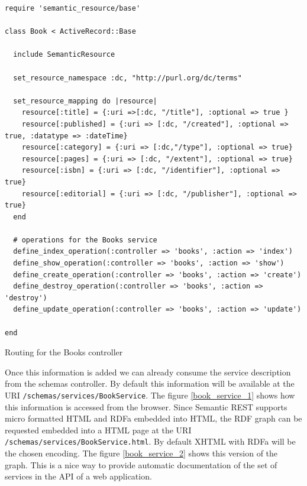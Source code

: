 \begin{table}
\vspace{5 mm}
\begin{lstlisting}
require 'semantic_resource/base'

class Book < ActiveRecord::Base

  include SemanticResource

  set_resource_namespace :dc, "http://purl.org/dc/terms"

  set_resource_mapping do |resource|
    resource[:title] = {:uri =>[:dc, "/title"], :optional => true }
    resource[:published] = {:uri => [:dc, "/created"], :optional => true, :datatype => :dateTime}
    resource[:category] = {:uri => [:dc,"/type"], :optional => true}
    resource[:pages] = {:uri => [:dc, "/extent"], :optional => true}
    resource[:isbn] = {:uri => [:dc, "/identifier"], :optional => true}
    resource[:editorial] = {:uri => [:dc, "/publisher"], :optional => true}
  end

  # operations for the Books service
  define_index_operation(:controller => 'books', :action => 'index')
  define_show_operation(:controller => 'books', :action => 'show')
  define_create_operation(:controller => 'books', :action => 'create')
  define_destroy_operation(:controller => 'books', :action => 'destroy')
  define_update_operation(:controller => 'books', :action => 'update')

end
\end{lstlisting} 
\vspace{5 mm}
\caption{Routing for the Books controller}
\label{book_3}
\end{table}

Once this information is added we can already consume the service description from the schemas controller. By default
this information will be available at the URI \texttt{/schemas/services/BookService}. The figure \ref{book_service_1}
shows how this information is accessed from the browser. Since Semantic REST supports micro formatted HTML and RDFa
embedded into HTML, the RDF graph can be requested embedded into a HTML page at the URI
\texttt{/schemas/services/BookService.html}. By default XHTML with RDFa will be the chosen encoding. The
figure \ref{book_service_2} shows this version of the graph. This is a nice way to provide automatic documentation of
the set of services in the API of a web application.

